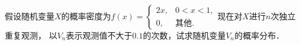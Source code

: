 \documentclass[plain,noanswer,medmath]{../../template/jnuexam}
\begin{document}

%



\begin{problem}
假设随机变量$X$的概率密度为$f(x) = \begin{cases}
  2x, & 0 < x < 1, \\
   0, & \text{其他}.
\end{cases}$现在对$X$进行$n$次独立重复观测，
以$V_n$表示观测值不大于$0.1$的次数，试求随机变量$V_n$的概率分布．
\end{problem}



%
\end{document}
